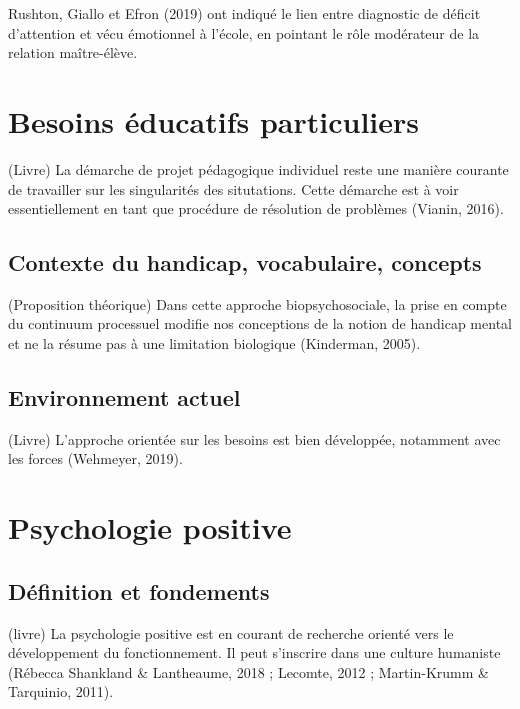 \documentclass[
  french,
]{article}
\begin{document}
Rushton, Giallo et Efron (2019) ont indiqué le lien entre diagnostic de déficit d'attention et vécu émotionnel à l'école, en pointant le rôle modérateur de la relation maître-élève.

\hypertarget{besoins-uxe9ducatifs-particuliers}{%
\section{Besoins éducatifs particuliers}\label{besoins-uxe9ducatifs-particuliers}}

(Livre) La démarche de projet pédagogique individuel reste une manière courante de travailler sur les singularités des situtations. Cette démarche est à voir essentiellement en tant que procédure de résolution de problèmes (Vianin, 2016).

\hypertarget{contexte-du-handicap-vocabulaire-concepts}{%
\subsection{Contexte du handicap, vocabulaire, concepts}\label{contexte-du-handicap-vocabulaire-concepts}}

(Proposition théorique) Dans cette approche biopsychosociale, la prise en compte du continuum processuel modifie nos conceptions de la notion de handicap mental et ne la résume pas à une limitation biologique (Kinderman, 2005).

\hypertarget{environnement-actuel}{%
\subsection{Environnement actuel}\label{environnement-actuel}}

(Livre) L'approche orientée sur les besoins est bien développée, notamment avec les forces (Wehmeyer, 2019).

\hypertarget{psychologie-positive}{%
\section{Psychologie positive}\label{psychologie-positive}}

\hypertarget{duxe9finition-et-fondements}{%
\subsection{Définition et fondements}\label{duxe9finition-et-fondements}}

(livre) La psychologie positive est en courant de recherche orienté vers le développement du fonctionnement. Il peut s'inscrire dans une culture humaniste (Rébecca Shankland \& Lantheaume, 2018 ; Lecomte, 2012 ; Martin-Krumm \& Tarquinio, 2011).
\end{document}
